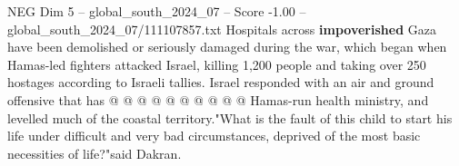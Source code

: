 \begin{textsample}{NEG Dim 5 – global\_south\_2024\_07 – Score -1.00 – global\_south\_2024\_07/111107857.txt}
Hospitals across \textbf{impoverished} Gaza have been demolished or seriously damaged during the war, which began when Hamas-led fighters attacked Israel, killing 1,200 people and taking over 250 hostages according to Israeli tallies.
Israel responded with an air and ground offensive that has @ @ @ @ @ @ @ @ @ @ Hamas-run health ministry, and levelled much of the coastal territory."What is the fault of this child to start his life under difficult and very bad circumstances, deprived of the most basic necessities of life?"said Dakran.

\end{textsample}
